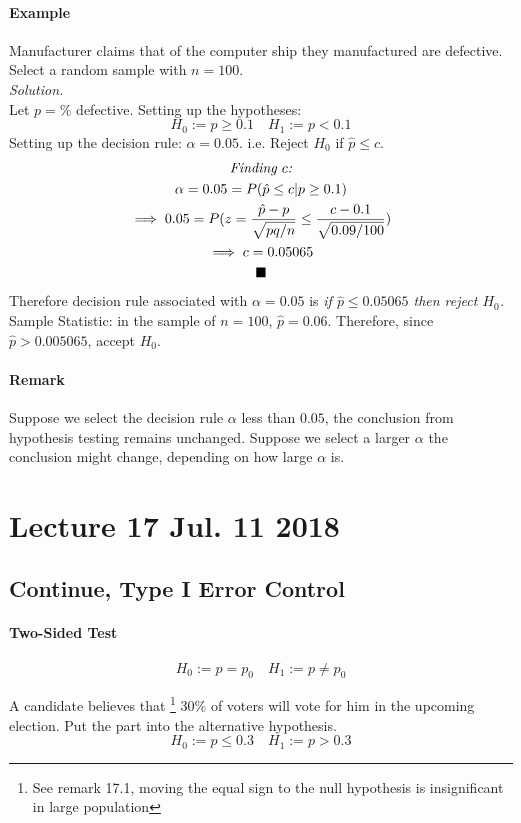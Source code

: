 \documentclass{article}
\begin{document}
			\paragraph{Example} Manufacturer claims that  of the computer ship they manufactured are defective. Select a random sample with $n=100$.
			\\
			\emph{Solution.}
			\\
			Let $p=\%$ defective. Setting up the hypotheses:
				\[
					H_0 := p \geq 0.1 \quad
					H_1 := p < 0.1
				\]
			Setting up the decision rule: $\alpha = 0.05$. i.e. Reject $H_0$ if $\hat{p} \leq c$.
			\begin{multline*}
				\emph{Finding $c$:} \\
				\alpha = 0.05 = P(\hat{p} \leq c | p \geq 0.1) \\
				\implies 0.05 = P(z=\frac{\hat{p}-p}{\sqrt{pq/n}} \leq \frac{c-0.1}{\sqrt{0.09/100}}) \\
				\implies c = 0.05065 \\
				\blacksquare
			\end{multline*}
			Therefore decision rule associated with $\alpha = 0.05$ is \emph{if $\hat{p} \leq 0.05065$ then reject $H_0$.}
			\\
			Sample Statistic: in the sample of $n=100$, $\hat{p} = 0.06$. Therefore, since $\hat{p} > 0.005065$, accept $H_0$.
			
			\paragraph{Remark} Suppose we select the decision rule $\alpha$ less than $0.05$, the conclusion from hypothesis testing remains unchanged. Suppose we select a larger $\alpha$ the conclusion might change, depending on how large $\alpha$ is.
			
	\section{Lecture 17 Jul. 11 2018}
	
	\subsection{Continue, Type I Error Control}
		\paragraph{Two-Sided Test}
			\[
				H_0 := p = p_0 \quad
				H_1 := p \neq p_0
			\]
		\begin{example}
			A candidate believes that  \footnote{See remark 17.1, moving the equal sign to the null hypothesis is insignificant in large population} $30\%$ of voters will vote for him in the upcoming election. Put the  part into the alternative hypothesis.
			\[
				H_0 := p \leq 0.3 \quad
				H_1 := p > 0.3
			\]
		\end{example}
		
\end{document}
